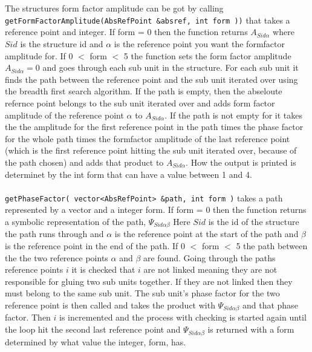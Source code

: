     \\\\The structures form factor amplitude can be got by calling \texttt{getFormFactorAmplitude(AbsRefPoint &absref, int form ))} that takes a reference point and integer. If form = 0 then the function returns $A_{Sid\alpha}$ where $Sid$ is the structure id and $\alpha$ is the reference point you want the formfactor amplitude for. If  0 $<$ form $<$ 5 the function sets the form factor amplitude $A_{Sid\alpha} = 0$ and goes through each sub unit in the structure. For each sub unit it finds the path between the reference point and the sub unit iterated over using the breadth first search algorithm. If the path is empty, then the abseloute refernce point belongs to the sub unit iterated over and adds form factor amplitude of the reference point $\alpha$ to $A_{Sid\alpha}$. If the path is not empty for it takes the the amplitude for the first reference point in the path times the phase factor for the whole path times the formfactor amplitude of the last reference point (which is the first reference point hitting the sub unit iterated over, because of the path chosen) and adds that product to $A_{Sid\alpha}$. How the output is printed is determinet by the int form that can have a value between 1 and 4. 
    \\\\ \texttt{getPhaseFactor( vector<AbsRefPoint> &path, int form )} takes a path represented by a vector and a integer form. If form = 0 then the function returns a symbolic representation of the path, $\Psi_{Sid\alpha \beta}$ Here $Sid$ is the id of the structure the path runs through and $\alpha$ is the reference point at the start of the path and $\beta$ is the reference point in the end of the path. If 0 $<$ form $<$ 5 the path between the the two reference points $\alpha$ and $\beta$ are found. Going through the paths reference points $i$ it is checked that $i$  are not linked meaning they are not responsible for gluing two sub units together. If they are not linked then they must belong to the same sub unit. The sub unit's phase factor for the two reference point is then called and takes the product with $\Psi_{Sid\alpha \beta}$ and that phase factor. Then $i$ is incremented and the process with checking is started again until the loop hit the second last reference point and $\Psi_{Sid\alpha \beta}$ is returned with a form determined by what value the integer, form, has. 
     
